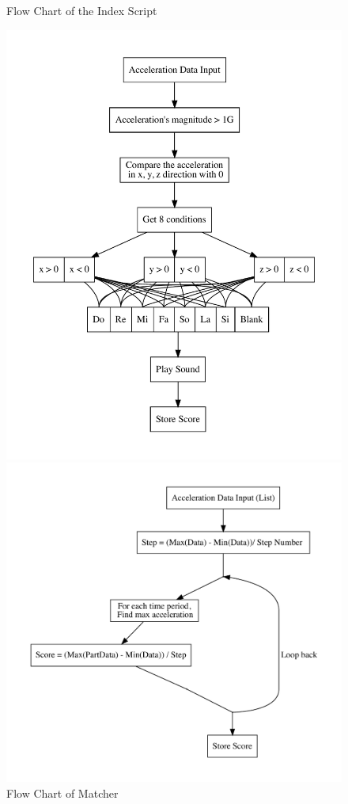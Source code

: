 \begin{figure}[H]
\begin{minipage}[b]{0.5\linewidth}
\caption{Flow Chart of the Index Script}
\label{indexScript}
\end{minipage}%
%
\begin{minipage}[b]{0.5\linewidth}
\centering
\includegraphics[width=1\linewidth]{figWR/ma}
\caption{Flow Chart of Matcher}
\label{FlowMatcher}
\vspace{4ex}
\centering
\includegraphics[width=1\linewidth]{figWR/sc}

\end{minipage}
\end{figure}
